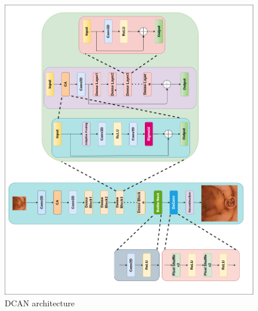 \begin{figure}[H]
    \centering
    \includegraphics[totalheight=7.5in]{Chapter6/Proposed_Final.png}
    \caption[DCAN architecture]{DCAN architecture}
    \label{fig:label6.8}
\end{figure}







